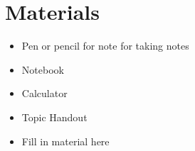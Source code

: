 \documentclass[main.tex]{subfiles}
\begin{document}
\section*{Materials}
\vspace{0.125in}
\begin{itemize}
  \item Pen or pencil for note for taking notes 
  \item Notebook 
  \item Calculator 
  \item Topic Handout
  \item Fill in material here 

\end{itemize}
\end{document}
